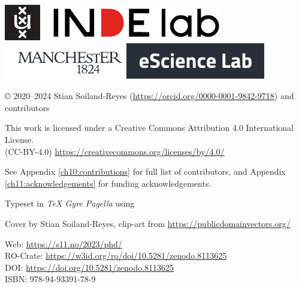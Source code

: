 \thispagestyle{empty}
\null
\newpage

\thispagestyle{empty} 

\vspace*{\fill}

\includegraphics{figures/indelab}\hspace{2em}
\includegraphics{figures/escienceLab-logo}

© 2020--2024 Stian Soiland-Reyes 
(\url{https://orcid.org/0000-0001-9842-9718})
and contributors

This work is licensed under a Creative Commons Attribution 4.0 International License. \\
(CC-BY-4.0) \url{https://creativecommons.org/licenses/by/4.0/}

See Appendix \ref{ch10:contributions} for full list of contributors, and Appendix \ref{ch11:acknowledgements} for funding acknowledgements.


Typeset in \emph{TeX Gyre Pagella} using \mybanner

Cover by Stian Soiland-Reyes, clip-art from \url{https://publicdomainvectors.org/}

Web: \url{https://s11.no/2023/phd/} \\
RO-Crate: \url{https://w3id.org/ro/doi/10.5281/zenodo.8113625}\\
DOI: \url{https://doi.org/10.5281/zenodo.8113625}\\
ISBN: 978-94-93391-78-9

\newpage
\thispagestyle{empty} 

